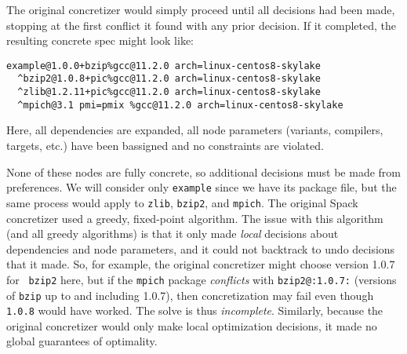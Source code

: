 The original concretizer would simply proceed until all decisions had been made,
stopping at the first conflict it found with any prior decision. If it completed, the
resulting concrete spec might look like:

\begin{verbatim}
example@1.0.0+bzip%gcc@11.2.0 arch=linux-centos8-skylake
  ^bzip2@1.0.8+pic%gcc@11.2.0 arch=linux-centos8-skylake
  ^zlib@1.2.11+pic%gcc@11.2.0 arch=linux-centos8-skylake
  ^mpich@3.1 pmi=pmix %gcc@11.2.0 arch=linux-centos8-skylake
\end{verbatim}

Here, all dependencies are expanded, all node parameters (variants, compilers, targets,
etc.) have been bassigned and no constraints are violated.

None of these nodes are fully concrete, so additional decisions must be made from
preferences. We will consider only \texttt{example} since we have its package file, but
the same process would apply to \texttt{zlib}, \texttt{bzip2}, and \texttt{mpich}. The
original Spack concretizer used a greedy, fixed-point algorithm. The issue with this
algorithm (and all greedy algorithms) is that it only made {\it local} decisions about
dependencies and node parameters, and it could not backtrack to undo decisions that it
made. So, for example, the original concretizer might choose version 1.0.7 for {\tt
  bzip2} here, but if the {\tt mpich} package {\it conflicts} with {\tt bzip2@:1.0.7:}
(versions of {\tt bzip} up to and including 1.0.7), then concretization may fail even
though {\tt 1.0.8} would have worked. The solve is thus {\it incomplete}. Similarly,
because the original concretizer would only make local optimization decisions, it made
no global guarantees of optimality.

